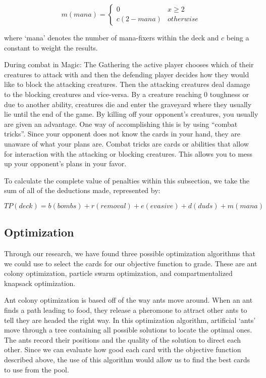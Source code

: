\documentclass[12pt, letterpaper]{article}
\begin{document}
$$
m(mana) = \begin{cases}
    0 & x \ge 2 \\
    c(2 - mana) & otherwise
\end{cases}
$$

where `mana' denotes the number of mana-fixers within the deck
and $ c $ being a constant to weight the results.

During combat in Magic: The Gathering
the active player chooses which of their creatures to attack with
and then the defending player decides how they would like to block the attacking creatures.
Then the attacking creatures deal damage to the blocking creatures and vice-versa.
By a creature reaching 0 toughness or due to another ability,
creatures die and enter the graveyard where they usually lie until the end of the game.
By killing off your opponent's creatures,
you usually are given an advantage.
One way of accomplishing this is by using \enquote{combat tricks}.
Since your opponent does not know the cards in your hand,
they are unaware of what your plans are.
Combat tricks are cards or abilities that allow for interaction
with the attacking or blocking creatures.
This allows you to mess up your opponent's plans in your favor.

To calculate the complete value of penalties within this subsection,
we take the sum of all of the deductions made,
represented by:

$$
TP(deck) = b(bombs) + r(removal) + e(evasive) + d(duds) + m(mana)
$$

\subsection{Optimization}
\label{sec:Optimization}


Through our research, we have found three possible optimization algorithms
that we could use to select the cards for our objective function to grade.
These are ant colony optimization, particle swarm optimization,
and compartmentalized knapsack optimization.

\label{paragraph:Ant colony}
Ant colony optimization is based off of the way ants move around.
When an ant finds a path leading to food,
they release a pheromone to attract other ants to tell they are headed the right way.
In this optimization algorithm, artificial `ants' move through a tree
containing all possible solutions to locate the optimal ones.
The ants record their positions and the quality of the solution to direct each other.
Since we can evaluate how good each card with the objective function described above,
the use of this algorithm
would allow us to find the best cards to use from the pool.
\end{document}
